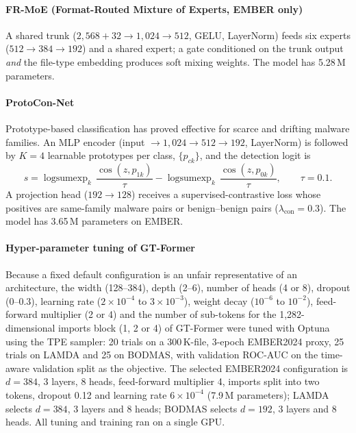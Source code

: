 \documentclass[fleqn,10pt]{wlscirep}
\newcommand{\gtf}{GT\mbox{-}Former}
\DeclareMathOperator{\lse}{logsumexp}
\begin{document}
\paragraph{FR-MoE (Format-Routed Mixture of Experts, EMBER only)}
A shared trunk ($2{,}568 + 32 \to 1{,}024 \to 512$, GELU, LayerNorm) feeds six experts ($512 \to 384 \to 192$) and a shared expert; a gate conditioned on the trunk output \emph{and} the file-type embedding produces soft mixing weights. The model has 5.28\,M parameters.

\paragraph{ProtoCon-Net}
Prototype-based classification has proved effective for scarce and drifting malware families\cite{tawfik2026fewshot}. An MLP encoder (input $\to 1{,}024 \to 512 \to 192$, LayerNorm) is followed by $K = 4$ learnable prototypes per class, $\{p_{ck}\}$, and the detection logit is
\begin{equation}
s = \lse_{k}\, \frac{\cos(z, p_{1k})}{\tau} - \lse_{k}\, \frac{\cos(z, p_{0k})}{\tau}, \qquad \tau = 0.1 .
\label{eq:proto}
\end{equation}
A projection head ($192 \to 128$) receives a supervised-contrastive loss\cite{khosla2020supcon} whose positives are same-family malware pairs or benign--benign pairs ($\lambda_{\mathrm{con}} = 0.3$). The model has 3.65\,M parameters on EMBER.

\paragraph{Hyper-parameter tuning of \gtf{}}
Because a fixed default configuration is an unfair representative of an architecture, the width (128--384), depth (2--6), number of heads (4 or 8), dropout (0--0.3), learning rate ($2 \times 10^{-4}$ to $3 \times 10^{-3}$), weight decay ($10^{-6}$ to $10^{-2}$), feed-forward multiplier (2 or 4) and the number of sub-tokens for the 1,282-dimensional imports block (1, 2 or 4) of \gtf{} were tuned with Optuna\cite{akiba2019optuna} using the TPE sampler: 20 trials on a 300\,K-file, 3-epoch EMBER2024 proxy, 25 trials on LAMDA and 25 on BODMAS, with validation ROC-AUC on the time-aware validation split as the objective. The selected EMBER2024 configuration is $d = 384$, 3 layers, 8 heads, feed-forward multiplier 4, imports split into two tokens, dropout 0.12 and learning rate $6 \times 10^{-4}$ (7.9\,M parameters); LAMDA selects $d = 384$, 3 layers and 8 heads; BODMAS selects $d = 192$, 3 layers and 8 heads. All tuning and training ran on a single GPU.
\end{document}
